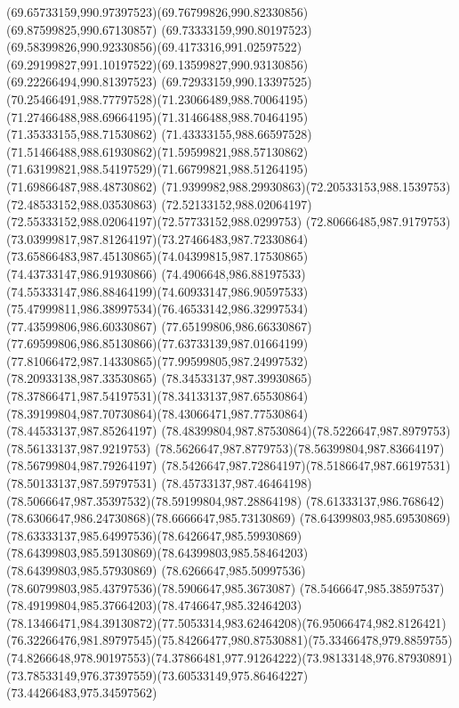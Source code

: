 {{	\curveto(69.65733159,990.97397523)(69.76799826,990.82330856)(69.87599825,990.67130857)
	\curveto(69.73333159,990.80197523)(69.58399826,990.92330856)(69.4173316,991.02597522)
	\curveto(69.29199827,991.10197522)(69.13599827,990.93130856)(69.22266494,990.81397523)
	\curveto(69.72933159,990.13397525)(70.25466491,988.77797528)(71.23066489,988.70064195)
	\curveto(71.27466488,988.69664195)(71.31466488,988.70464195)(71.35333155,988.71530862)
	\curveto(71.43333155,988.66597528)(71.51466488,988.61930862)(71.59599821,988.57130862)
	\curveto(71.63199821,988.54197529)(71.66799821,988.51264195)(71.69866487,988.48730862)
	\curveto(71.9399982,988.29930863)(72.20533153,988.1539753)(72.48533152,988.03530863)
	\curveto(72.52133152,988.02064197)(72.55333152,988.02064197)(72.57733152,988.0299753)
	\curveto(72.80666485,987.9179753)(73.03999817,987.81264197)(73.27466483,987.72330864)
	\curveto(73.65866483,987.45130865)(74.04399815,987.17530865)(74.43733147,986.91930866)
	\curveto(74.4906648,986.88197533)(74.55333147,986.88464199)(74.60933147,986.90597533)
	\curveto(75.47999811,986.38997534)(76.46533142,986.32997534)(77.43599806,986.60330867)
	\curveto(77.65199806,986.66330867)(77.69599806,986.85130866)(77.63733139,987.01664199)
	\curveto(77.81066472,987.14330865)(77.99599805,987.24997532)(78.20933138,987.33530865)
	\curveto(78.34533137,987.39930865)(78.37866471,987.54197531)(78.34133137,987.65530864)
	\curveto(78.39199804,987.70730864)(78.43066471,987.77530864)(78.44533137,987.85264197)
	\curveto(78.48399804,987.87530864)(78.5226647,987.8979753)(78.56133137,987.9219753)
	\curveto(78.5626647,987.8779753)(78.56399804,987.83664197)(78.56799804,987.79264197)
	\curveto(78.5426647,987.72864197)(78.5186647,987.66197531)(78.50133137,987.59797531)
	\curveto(78.45733137,987.46464198)(78.5066647,987.35397532)(78.59199804,987.28864198)
	\curveto(78.61333137,986.768642)(78.6306647,986.24730868)(78.6666647,985.73130869)
	\curveto(78.64399803,985.69530869)(78.63333137,985.64997536)(78.6426647,985.59930869)
	\curveto(78.64399803,985.59130869)(78.64399803,985.58464203)(78.64399803,985.57930869)
	\curveto(78.6266647,985.50997536)(78.60799803,985.43797536)(78.5906647,985.3673087)
	\curveto(78.5466647,985.38597537)(78.49199804,985.37664203)(78.4746647,985.32464203)
	\curveto(78.13466471,984.39130872)(77.5053314,983.62464208)(76.95066474,982.8126421)
	\curveto(76.32266476,981.89797545)(75.84266477,980.87530881)(75.33466478,979.8859755)
	\curveto(74.8266648,978.90197553)(74.37866481,977.91264222)(73.98133148,976.87930891)
	\curveto(73.78533149,976.37397559)(73.60533149,975.86464227)(73.44266483,975.34597562)
}}
